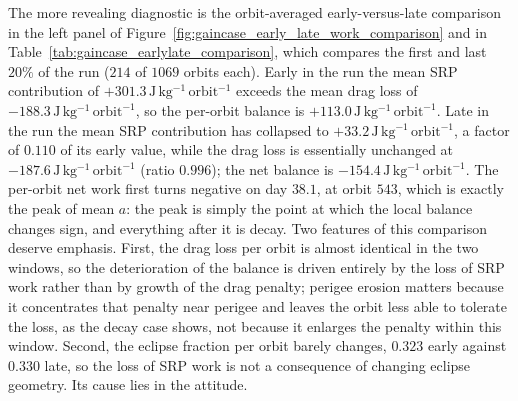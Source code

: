 \vspace{5pt}
\par\noindent The more revealing diagnostic is the orbit-averaged early-versus-late comparison in the left panel of Figure~\ref{fig:gaincase_early_late_work_comparison} and in Table~\ref{tab:gaincase_earlylate_comparison}, which compares the first and last \(20\%\) of the run (\(214\) of \(1069\) orbits each). Early in the run the mean SRP contribution of \(+301.3\,\mathrm{J\,kg^{-1}\,orbit^{-1}}\) exceeds the mean drag loss of \(-188.3\,\mathrm{J\,kg^{-1}\,orbit^{-1}}\), so the per-orbit balance is \(+113.0\,\mathrm{J\,kg^{-1}\,orbit^{-1}}\). Late in the run the mean SRP contribution has collapsed to \(+33.2\,\mathrm{J\,kg^{-1}\,orbit^{-1}}\), a factor of \(0.110\) of its early value, while the drag loss is essentially unchanged at \(-187.6\,\mathrm{J\,kg^{-1}\,orbit^{-1}}\) (ratio \(0.996\)); the net balance is \(-154.4\,\mathrm{J\,kg^{-1}\,orbit^{-1}}\). The per-orbit net work first turns negative on day \(38.1\), at orbit \(543\), which is exactly the peak of mean \(a\): the peak is simply the point at which the local balance changes sign, and everything after it is decay. Two features of this comparison deserve emphasis. First, the drag loss per orbit is almost identical in the two windows, so the deterioration of the balance is driven entirely by the loss of SRP work rather than by growth of the drag penalty; perigee erosion matters because it concentrates that penalty near perigee and leaves the orbit less able to tolerate the loss, as the decay case shows, not because it enlarges the penalty within this window. Second, the eclipse fraction per orbit barely changes, \(0.323\) early against \(0.330\) late, so the loss of SRP work is not a consequence of changing eclipse geometry. Its cause lies in the attitude.

